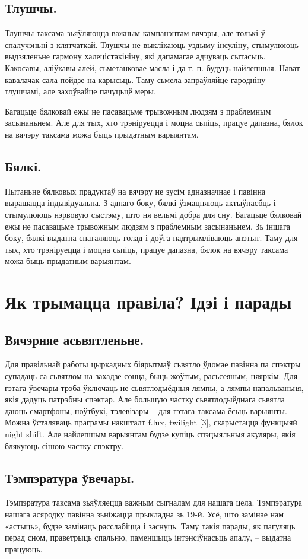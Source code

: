 \subsection{Тлушчы.}
Тлушчы таксама зьяўляюцца важным кампанэнтам вячэры, але толькі ў спалучэньні з клятчаткай. Тлушчы не выклікаюць уздыму інсуліну, стымулююць выдзяленьне гармону халецістакініну, які дапамагае адчуваць сытасьць. Какосавы, аліўкавы алей, сьметанковае масла і да т. п. будуць найлепшыя. Нават кавалачак сала пойдзе на карысьць. Таму сьмела запраўляйце гародніну тлушчамі, але захоўвайце пачуцьцё меры.

Багацьце бялковай ежы не пасавацьме трывожным людзям з праблемным засынаньнем. Але для тых, хто трэніруецца і моцна сьпіць, працуе дапазна, бялок на вячэру таксама можа быць прыдатным варыянтам.

\subsection{Бялкі.}
Пытаньне бялковых прадуктаў на вячэру не зусім адназначнае і павінна вырашацца індывідуальна. З аднаго боку, бялкі ўзмацняюць актыўнасбць і стымулююць нэрвовую сыстэму, што ня вельмі добра для сну. Багацьце бялковай ежы не пасавацьме трывожным людзям з праблемным засынаньнем. Зь іншага боку, бялкі выдатна спаталяюць голад і доўга падтрымліваюць апэтыт. Таму для тых, хто трэніруецца і моцна сьпіць, працуе дапазна, бялок на вячэру таксама можа быць прыдатным варыянтам.

\section{Як трымацца правіла? Ідэі і парады}

\subsection{Вячэрняе асьвятленьне.}
Для правільнай работы цыркадных біярытмаў сьвятло ўдомае павінна па спэктры супадаць са сьвятлом на захадзе сонца, быць жоўтым, расьсеяным, няяркім. Для гэтага ўвечары трэба ўключаць не сьвятлодыёдныя лямпы, а лямпы напальваньня, якія дадуць патрэбны спэктар. Але большую частку сьвятлодыёднага сьвятла даюць смартфоны, ноўтбукі, тэлевізары – для гэтага таксама ёсьць варыянты. Можна ўсталяваць праграмы накшталт f.lux, twilight [3], скарыстацца функцыяй night shift. Але найлепшым варыянтам будзе купіць спэцыяльныя акуляры, якія блякуюць сінюю частку спэктру.

\subsection{Тэмпэратура ўвечары.}
Тэмпэратура таксама зьяўляецца важным сыгналам для нашага цела. Тэмпэратура нашага асяродку павінна зьніжацца прыкладна зь 19-й. Усё, што замінае нам «астыць», будзе замінаць расслабіцца і заснуць. Таму такія парады, як пагуляць перад сном, праветрыць спальню, паменшыць інтэнсіўнасьць апалу, – выдатна працуюць.

